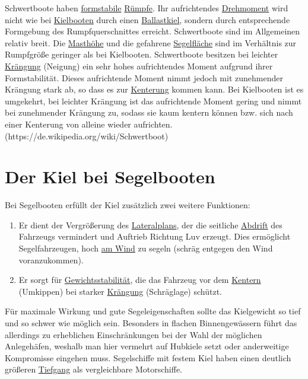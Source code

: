  Schwertboote haben \href{https://de.wikipedia.org/wiki/Formstabilit\%C3\%A4t}{formstabile} \href{https://de.wikipedia.org/wiki/Schiffsrumpf}{Rümpfe}. Ihr aufrichtendes \href{https://de.wikipedia.org/wiki/Drehmoment}{Drehmoment} wird nicht wie bei \href{https://de.wikipedia.org/wiki/Kielboot}{Kielbooten} durch einen \href{https://de.wikipedia.org/wiki/Kiel_(Schiffbau)\#Flossenkiel}{Ballastkiel}, sondern durch entsprechende Formgebung des Rumpfquerschnittes erreicht. Schwertboote sind im Allgemeinen relativ breit. Die \href{https://de.wikipedia.org/wiki/Schiffsmast}{Masthöhe} und die gefahrene \href{https://de.wikipedia.org/wiki/Segelfl\%C3\%A4che}{Segelfläche} sind im Verhältnis zur Rumpfgröße geringer als bei Kielbooten. Schwertboote besitzen bei leichter \href{https://de.wikipedia.org/wiki/Kr\%C3\%A4ngung}{Krängung} (Neigung) ein sehr hohes aufrichtendes Moment aufgrund ihrer Formstabilität. Dieses aufrichtende Moment nimmt jedoch mit zunehmender Krängung stark ab, so dass es zur \href{https://de.wikipedia.org/wiki/Kenterung}{Kenterung} kommen kann. Bei Kielbooten ist es umgekehrt, bei leichter Krängung ist das aufrichtende Moment gering und nimmt bei zunehmender Krängung zu, sodass sie kaum kentern können bzw. sich nach einer Kenterung von alleine wieder aufrichten.  (https://de.wikipedia.org/wiki/Schwertboot)


\section{Der Kiel bei Segelbooten} 

Bei Segelbooten erfüllt der Kiel zusätzlich zwei weitere Funktionen: 

\begin{enumerate}
    \item Er dient der Vergrößerung des \href{https://de.wikipedia.org/wiki/Lateralplan}{Lateralplans}, der die seitliche \href{https://de.wikipedia.org/wiki/Abdrift}{Abdrift} des Fahrzeugs vermindert und Auftrieb Richtung Luv erzeugt. Dies ermöglicht Segelfahrzeugen, hoch \href{https://de.wikipedia.org/wiki/Kurse_zum_Wind}{am Wind} zu segeln (schräg entgegen den Wind voranzukommen).
    \item Er sorgt für \href{https://de.wikipedia.org/wiki/Stabilit\%C3\%A4t_(Schiffsk\%C3\%B6rper)\#Gewichtsstabilit\%C3\%A4t}{Gewichtsstabilität}, die das Fahrzeug vor dem \href{https://de.wikipedia.org/wiki/Kentern}{Kentern} (Umkippen) bei starker \href{https://de.wikipedia.org/wiki/Kr\%C3\%A4ngung}{Krängung} (Schräglage) schützt.
\end{enumerate}
Für maximale Wirkung und gute Segeleigenschaften sollte das Kielgewicht so tief und so schwer wie möglich sein. Besonders in flachen Binnengewässern führt das allerdings zu erheblichen Einschränkungen bei der Wahl der möglichen Anlegehäfen, weshalb man hier vermehrt auf Hubkiele setzt oder anderweitige Kompromisse eingehen muss. Segelschiffe mit festem Kiel haben einen deutlich größeren \href{https://de.wikipedia.org/wiki/Tiefgang}{Tiefgang} als vergleichbare Motorschiffe. 

